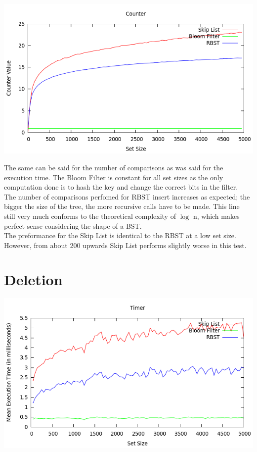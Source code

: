 \documentclass[11pt, notitlepage]{report}
\begin{document}
\includegraphics[width=\linewidth]{img/Counter-Add}

The same can be said for the number of comparisons as was said for the execution time. The Bloom Filter is constant for all set sizes as the only computation done is to hash the key and change the correct bits in the filter.\\

The number of comparisons perfomed for RBST insert increases as expected; the bigger the size of the tree, the more recursive calls have to be made. This line still very much conforms to the theoretical complexity of $\log$ n, which makes perfect sense considering the shape of a BST.\\

The preformance for the Skip List is identical to the RBST at a low set size. However, from about 200 upwards Skip List performs slightly worse in this test.

\section*{Deletion}

\includegraphics[width=\linewidth]{img/Timer-Del}
\end{document}
